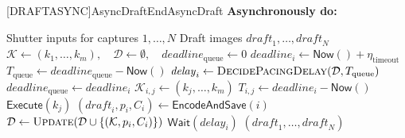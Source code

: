 \begin{algorithm}[t]
\caption{Budget-Aware Draft Controller}
\label{alg:overview}
\footnotesize
\renewcommand{\algorithmicrequire}{\textbf{Input:}}
\renewcommand{\algorithmicensure}{\textbf{Output:}}
[DRAFTASYNC]{AsyncDraft}{EndAsyncDraft}
  {\textbf{Asynchronously do:}}
  {\algorithmicend}
\begin{algorithmic}[1]
\Require Shutter inputs for captures $1,\ldots,N$
\Ensure Draft images $\mathit{draft}_1,\ldots,\mathit{draft}_N$
\State $\mathcal K\gets(k_1,\ldots,k_m),\quad\mathcal D\gets\emptyset,\quad\mathit{deadline}_{\mathrm{queue}}\gets0$ \label{alg:ov:configure}\label{alg:ov:history}\label{alg:ov:queue-init}
\State
{}
  \State $\mathit{deadline}_i\gets\textsf{Now}()+\eta_{\mathrm{timeout}}$  \label{alg:ov:timeout}
  \State $T_{\mathrm{queue}}\gets\mathit{deadline}_{\mathrm{queue}}-\textsf{Now}()$ \label{alg:ov:queue-budget}
  \State $\mathit{delay}_i\gets\Call{DecidePacingDelay}{\mathcal D,T_{\mathrm{queue}}}$ \label{alg:ov:pacing}
  \State
  \State $\mathit{deadline}_{\mathrm{queue}}\gets\mathit{deadline}_i$ \label{alg:ov:queue-update}
  \AsyncDraft \label{alg:ov:async}
      \State $\mathcal K_{i,j}\gets(k_j,\ldots,k_m)$ \label{alg:ov:remaining}
      \State $T_{i,j}\gets\mathit{deadline}_i-\textsf{Now}()$ \label{alg:ov:remaining-budget}
       \label{alg:ov:admission}
        \State $\textsf{Execute}(k_j)$
      \EndIf
    \EndFor
    \State $(\mathit{draft}_i,p_i,C_i)\gets\textsf{EncodeAndSave}(i)$ \label{alg:ov:publish}
    \State $\mathcal D\gets\Call{Update}{\mathcal D\cup\{(\mathcal K,p_i,C_i)\}}$ \label{alg:ov:record}\label{alg:ov:update}
  \EndAsyncDraft
  \State $\textsf{Wait}(\mathit{delay}_i)$ \label{alg:ov:wait}
\EndFor
\State \Return $(\mathit{draft}_1,\ldots,\mathit{draft}_N)$
\end{algorithmic}
\end{algorithm}